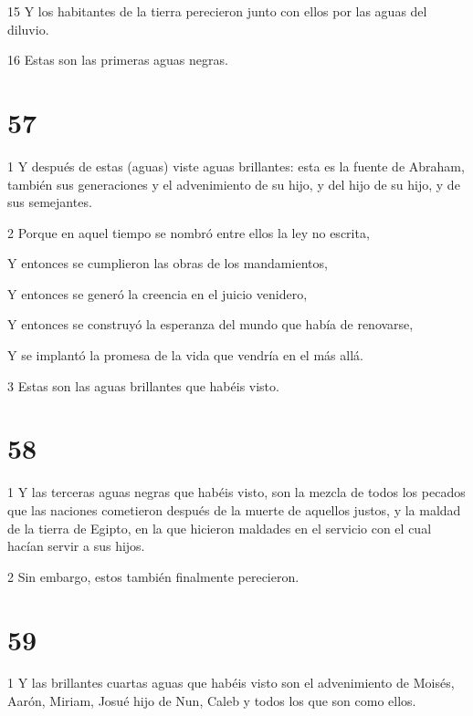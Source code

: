 \par 15 Y los habitantes de la tierra perecieron junto con ellos por las aguas del diluvio.

\par 16 Estas son las primeras aguas negras.

\chapter{57}

\par 1 Y después de estas (aguas) viste aguas brillantes: esta es la fuente de Abraham, también sus generaciones y el advenimiento de su hijo, y del hijo de su hijo, y de sus semejantes.

\par 2 Porque en aquel tiempo se nombró entre ellos la ley no escrita,

\par Y entonces se cumplieron las obras de los mandamientos,

\par Y entonces se generó la creencia en el juicio venidero,

\par Y entonces se construyó la esperanza del mundo que había de renovarse,

\par Y se implantó la promesa de la vida que vendría en el más allá.

\par 3 Estas son las aguas brillantes que habéis visto.

\chapter{58}

\par 1 Y las terceras aguas negras que habéis visto, son la mezcla de todos los pecados que las naciones cometieron después de la muerte de aquellos justos, y la maldad de la tierra de Egipto, en la que hicieron maldades en el servicio con el cual hacían servir a sus hijos.

\par 2 Sin embargo, estos también finalmente perecieron.

\chapter{59}

\par 1 Y las brillantes cuartas aguas que habéis visto son el advenimiento de Moisés, Aarón, Miriam, Josué hijo de Nun, Caleb y todos los que son como ellos.


